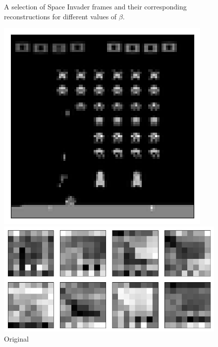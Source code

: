 \begin{figure}[h!]
\begin{multicols}{4}
    \caption{$\beta = 4$}
\end{multicols}
\caption{A selection of Space Invader frames and their corresponding reconstructions for different values of $\beta$.}
\label{fig:naive_average_originals_and_reconstructions}
\end{figure}



\begin{figure}[h!]
\centering
\captionsetup{justification=centering}
\begin{minipage}{0.4\textwidth}
\centering
\captionsetup{justification=centering}
\includegraphics[scale=0.4]{figures/results/naive_average/beta_1_sample_3_original.png}
\caption{Original}
\end{minipage}
\begin{minipage}{0.55\textwidth}
\centering
\captionsetup{justification=centering}
\includegraphics[scale=0.42]{figures/results/naive_average/beta_1_convolutional_layers_sample_3.png}

\end{minipage}
\end{figure}

